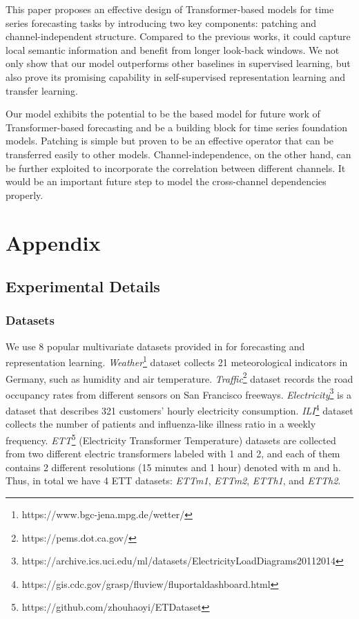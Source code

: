 \documentclass{article} %
\begin{document}
This paper proposes an effective design of Transformer-based models for time series forecasting tasks by introducing two key components: patching and channel-independent structure. Compared to the previous works, it could capture local semantic information and benefit from longer look-back windows. We not only show that our model outperforms other baselines in supervised learning, but also prove its promising capability in self-supervised representation learning and transfer learning.

Our model exhibits the potential to be the based model for future work of Transformer-based forecasting and be a building block for time series foundation models. Patching is simple but proven to be an effective operator that can be transferred easily to other models. Channel-independence, on the other hand, can be further exploited to incorporate the correlation between different channels. It would be an important future step to model the cross-channel dependencies properly.






\newpage 
\appendix
\section{Appendix}


\subsection{Experimental Details}
\label{append:exp}

\subsubsection{Datasets}

We use $8$ popular multivariate datasets provided in \citep{autoformer} for forecasting and representation learning. \textit{Weather}\footnote{https://www.bgc-jena.mpg.de/wetter/} dataset collects 21 meteorological indicators in Germany, such as humidity and air temperature. \textit{Traffic}\footnote{https://pems.dot.ca.gov/} dataset records the road occupancy rates from different sensors on San Francisco freeways. \textit{Electricity}\footnote{https://archive.ics.uci.edu/ml/datasets/ElectricityLoadDiagrams20112014} is a dataset that describes 321 customers' hourly electricity consumption. \textit{ILI}\footnote{https://gis.cdc.gov/grasp/fluview/fluportaldashboard.html} dataset collects the number of patients and influenza-like illness ratio in a weekly frequency. \textit{ETT}\footnote{https://github.com/zhouhaoyi/ETDataset} (Electricity Transformer Temperature) datasets are collected from two different electric transformers labeled with 1 and 2, and each of them contains 2 different resolutions (15 minutes and 1 hour) denoted with m and h. Thus, in total we have 4 ETT datasets: \textit{ETTm1}, \textit{ETTm2}, \textit{ETTh1}, and \textit{ETTh2}. 
\end{document}
